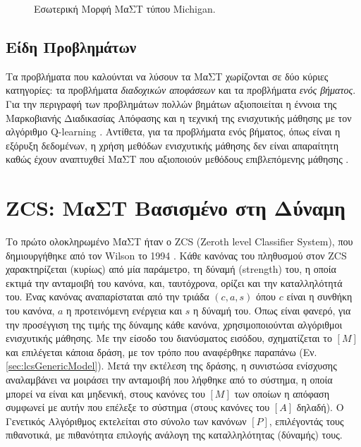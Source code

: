\begin{figure}[htb]
 \begin{center}
  
  \caption{Εσωτερική Μορφή ΜαΣΤ τύπου Michigan.}
  \label{fig:michiganLcs}
 \end{center}
\end{figure}


\subsection{Είδη Προβλημάτων}
Τα προβλήματα που καλούνται να λύσουν τα ΜαΣΤ χωρίζονται σε δύο κύριες κατηγορίες: τα προβλήματα \emph{διαδοχικών αποφάσεων} και τα προβλήματα \emph{ενός βήματος}. Για την περιγραφή των προβλημάτων πολλών βημάτων αξιοποιείται η έννοια της Μαρκοβιανής Διαδικασίας Απόφασης και η τεχνική της ενισχυτικής μάθησης με τον αλγόριθμο Q-learning \cite{watkins1989learning}. Αντίθετα, για τα προβλήματα ενός βήματος, όπως είναι η εξόρυξη δεδομένων, η χρήση μεθόδων ενισχυτικής μάθησης δεν είναι απαραίτητη καθώς έχουν αναπτυχθεί ΜαΣΤ που αξιοποιούν μεθόδους επιβλεπόμενης μάθησης \cite{DBLP:series/sci/2008-125}.


\section{ZCS: ΜαΣΤ Βασισμένο στη Δύναμη}
Το πρώτο ολοκληρωμένο ΜαΣΤ ήταν ο ZCS (Zeroth level Classifier System), που δημιουργήθηκε από τον Wilson το 1994 \cite{WilsonZCS}. Κάθε κανόνας του πληθυσμού στον ZCS χαρακτηρίζεται (κυρίως) από μία παράμετρο, τη δύναμή (strength) του, η οποία εκτιμά την ανταμοιβή του κανόνα, και, ταυτόχρονα, ορίζει και την καταλληλότητά του. Ένας κανόνας αναπαρίσταται από την τριάδα $(c, a, s)$ όπου $c$ είναι η συνθήκη του κανόνα, $a$ η προτεινόμενη ενέργεια και $s$ η δύναμή του. Όπως είναι φανερό, για την προσέγγιση της τιμής της δύναμης κάθε κανόνα, χρησιμοποιούνται αλγόριθμοι ενισχυτικής μάθησης. Με την είσοδο του διανύσματος εισόδου, σχηματίζεται το $[M]$ και επιλέγεται κάποια δράση, με τον τρόπο που αναφέρθηκε παραπάνω (Εν. \ref{sec:lcsGenericModel}). Μετά την εκτέλεση της δράσης, η συνιστώσα ενίσχυσης αναλαμβάνει να μοιράσει την ανταμοιβή που λήφθηκε από το σύστημα, η οποία μπορεί να είναι και μηδενική, στους κανόνες του $[M]$ των οποίων η απόφαση συμφωνεί με αυτήν που επέλεξε το σύστημα (στους κανόνες του $[A]$ δηλαδή). Ο Γενετικός Αλγόριθμος εκτελείται στο σύνολο των κανόνων $[P]$, επιλέγοντάς τους πιθανοτικά, με πιθανότητα επιλογής ανάλογη της καταλληλότητας (δύναμής) τους.

